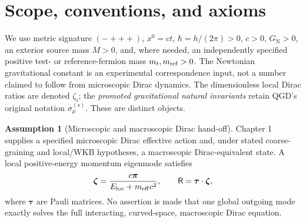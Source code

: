 \documentclass[11pt,a4paper,oneside]{report}
\numberwithin{equation}{chapter}
\theoremstyle{definition}\newtheorem{definition}[theorem]{Definition}
\newtheorem{assumption}[theorem]{Assumption}
\theoremstyle{remark}\newtheorem{remark}[theorem]{Remark}
\newcommand{\GNewton}{G_{\mathrm N}}
\begin{document}
\section{Scope, conventions, and axioms}\label{sec:scope}
We use metric signature $(-+++)$, $x^0=ct$, $\hbar=h/(2\pi)>0$, $c>0$, $\GNewton>0$, an exterior source mass $M>0$, and, where needed, an independently specified positive test- or reference-fermion mass $m_t,m_{\rm ref}>0$. The Newtonian gravitational constant is an experimental correspondence input, not a number claimed to follow from microscopic Dirac dynamics. The dimensionless local Dirac ratios are denoted $\zeta_i$; the \emph{promoted gravitational natural invariants} retain QGD's original notation $\sigma_{\mu}^{(s)}$. These are distinct objects.

\begin{assumption}[Microscopic and macroscopic Dirac hand-off]\label{ass:dirac}
Chapter 1 supplies a specified microscopic Dirac effective action and, under stated coarse-graining and local/WKB hypotheses, a macroscopic Dirac-equivalent state. A local positive-energy momentum eigenmode satisfies
\begin{equation}
\bm\zeta=\frac{c\bm\pi}{E_{\rm loc}+m_{\rm eff}c^2},\qquad
\mathsf R=\bm\tau\cdot\bm\zeta,
\label{eq:ratio}
\end{equation}
where $\bm\tau$ are Pauli matrices. No assertion is made that one global outgoing mode exactly solves the full interacting, curved-space, macroscopic Dirac equation.
\end{assumption}
\end{document}
